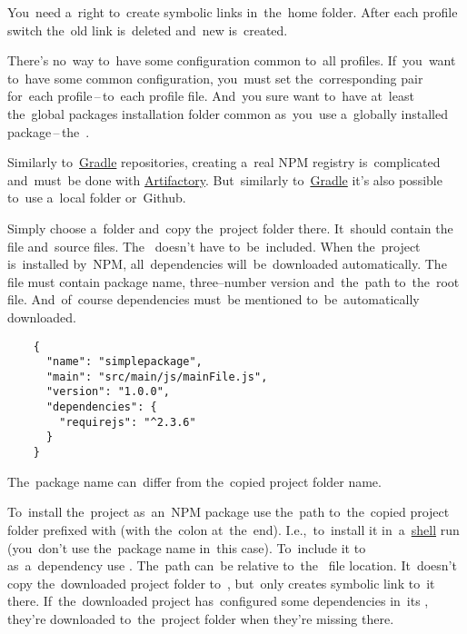 \warning You~need a~right to~create symbolic links in~the~home folder.
After each profile switch the~old  link is~deleted and~new is~created.

\warning There's no~way to~have some configuration common to~all profiles.
If~you~want to~have some common configuration, you~must set the~corresponding  pair for~each profile\,--\,to~each profile file.
And~you sure want to~have at~least the~global packages installation folder common as~you~use a~globally installed package\,--\,the~.

Similarly to~\hyperref[gradle]{Gradle} repositories, creating a~real NPM registry is~complicated and~must~be done with \href{https://jfrog.com/artifactory/}{Artifactory}.
But~similarly to~\hyperref[gradle]{Gradle} it's also possible to~use a~local folder or~Github.

\label{npmpublishlocal}
Simply choose a~folder and~copy the~project folder there.
It~should contain the~ file and~source files.
The~ doesn't have to~be~included.
When the~project is~installed by~NPM, all~dependencies will~be~downloaded automatically.
The~ file must contain package name, three--number version and~the~path to~the~root file.
And~of~course dependencies must~be mentioned to~be~automatically downloaded.

\begin{lstlisting}
    {
      "name": "simplepackage",
      "main": "src/main/js/mainFile.js",
      "version": "1.0.0",
      "dependencies": {
        "requirejs": "^2.3.6"
      }
    }
\end{lstlisting}

\note The~package name can~differ from the~copied project folder name.
\newline

\noindent To~install the~project as~an~NPM package use the~path to~the~copied project folder prefixed with  (with the~colon at~the~end).
I.e.,~to~install it in~a~\hyperref[shellcligui]{shell} run  (you~don't use the~package name in~this case).
To~include it to~ as~a~dependency use .
The~path can~be relative to~the~ file location.
It~doesn't copy the~downloaded project folder to~, but~only creates symbolic link to~it there.
If~the~downloaded project has~configured some dependencies in~its , they're downloaded to~the~project folder when they're missing there.

